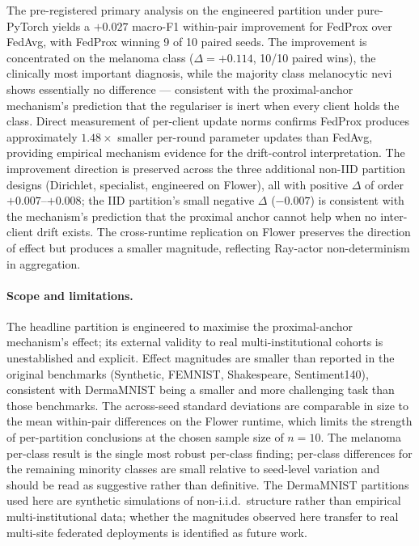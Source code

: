 The pre-registered primary analysis on the engineered partition
under pure-PyTorch yields a $+0.027$ macro-F1 within-pair improvement
for FedProx over FedAvg, with FedProx winning 9 of 10 paired seeds.
The improvement is concentrated on the melanoma class
($\Delta = +0.114$, 10/10 paired wins), the clinically most
important diagnosis, while the majority class melanocytic nevi
shows essentially no difference --- consistent with the
proximal-anchor mechanism's prediction that the regulariser is
inert when every client holds the class. Direct measurement of
per-client update norms confirms FedProx produces approximately
$1.48\times$ smaller per-round parameter updates than FedAvg,
providing empirical mechanism evidence for the drift-control
interpretation. The improvement direction is preserved across the
three additional non-IID partition designs (Dirichlet, specialist,
engineered on Flower), all with positive $\Delta$ of order
$+0.007$--$+0.008$; the IID partition's small negative $\Delta$
($-0.007$) is consistent with the mechanism's prediction that the
proximal anchor cannot help when no inter-client drift exists. The
cross-runtime replication on Flower preserves the direction of
effect but produces a smaller magnitude, reflecting Ray-actor
non-determinism in aggregation.

\paragraph{Scope and limitations.}
The headline partition is engineered to maximise the proximal-anchor
mechanism's effect; its external validity to real multi-institutional
cohorts is unestablished and explicit. Effect magnitudes are smaller
than reported in the original \citet{li2020fedprox} benchmarks
(Synthetic, FEMNIST, Shakespeare, Sentiment140), consistent with
DermaMNIST being a smaller and more challenging task than those
benchmarks. The across-seed standard deviations are comparable in
size to the mean within-pair differences on the Flower runtime,
which limits the strength of per-partition conclusions at the chosen
sample size of $n = 10$. The melanoma per-class result is the
single most robust per-class finding; per-class differences for the
remaining minority classes are small relative to seed-level
variation and should be read as suggestive rather than definitive.
The DermaMNIST partitions used here are synthetic simulations of
non-i.i.d.\ structure rather than empirical multi-institutional
data; whether the magnitudes observed here transfer to real
multi-site federated deployments is identified as future work.
